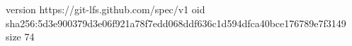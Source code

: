 version https://git-lfs.github.com/spec/v1
oid sha256:5d3e900379d3e06f921a78f7edd068ddf636c1d594dfca40bce176789e7f3149
size 74
